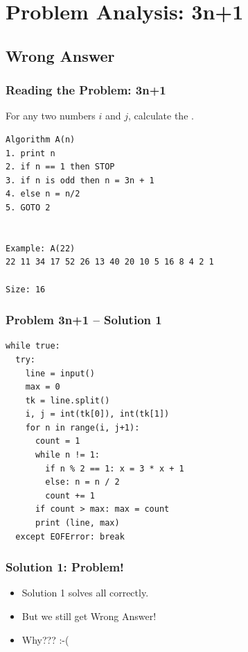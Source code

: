 \documentclass{beamer}
\begin{document}
\section{Problem Analysis: 3n+1}
\subsection{Wrong Answer}
\begin{frame}[fragile]
  \frametitle{Reading the Problem: 3n+1}

  \begin{block}{}
    For any two numbers $i$ and $j$, calculate the .
  \end{block}

  \bigskip

\begin{verbatim}
Algorithm A(n)
1. print n
2. if n == 1 then STOP
3. if n is odd then n = 3n + 1
4. else n = n/2
5. GOTO 2


Example: A(22)
22 11 34 17 52 26 13 40 20 10 5 16 8 4 2 1

Size: 16
\end{verbatim}
\end{frame}

\begin{frame}[fragile]
  \frametitle{Problem 3n+1 -- Solution 1}
\begin{verbatim}
while true:
  try:
    line = input()
    max = 0
    tk = line.split()
    i, j = int(tk[0]), int(tk[1])
    for n in range(i, j+1):
      count = 1
      while n != 1:
        if n % 2 == 1: x = 3 * x + 1
        else: n = n / 2
        count += 1
      if count > max: max = count
      print (line, max)
  except EOFError: break
\end{verbatim}
\end{frame}

\begin{frame}
  \frametitle{Solution 1: Problem!}

  \begin{itemize}
    \item Solution 1 solves all  correctly.
    \bigskip

    \item But we still get \alert{Wrong Answer!}
    \bigskip

    \item Why??? :-(
  \end{itemize}
\end{frame}
\end{document}
